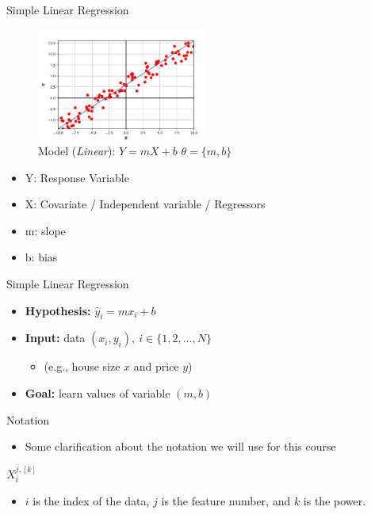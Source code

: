 \begin{frame}{Simple Linear Regression}
    \begin{figure}
        \centering
        \includegraphics[width=0.5\textwidth]{images/linear-regression/linear-regression-5.png}
        \caption*{\small Model (\textit{Linear}): $Y = mX + b$ \hfill $\theta = \{m, b\}$}
    \end{figure}

    \begin{itemize}
        \item Y: Response Variable
        \item X: Covariate / Independent variable / Regressors
        \item m: slope
        \item b: bias
    \end{itemize}
\end{frame}


\begin{frame}{Simple Linear Regression}
    \begin{itemize}
        \item \textbf{Hypothesis:} $\hat{y}_i = mx_i + b$
        
        \item \textbf{Input:} data $(x_i, y_i), \ i \in \{1, 2, \ldots, N\}$
        \begin{itemize}
            \item (e.g., house size $x$ and price $y$)
        \end{itemize}
        
        \item \textbf{Goal:} learn values of variable $(m, b)$
    \end{itemize}
\end{frame}

\begin{frame}{Notation}
    \begin{itemize}
        \item Some clarification about the notation we will use for this course
    \end{itemize}

    \begin{center}
        {\Huge $X_i^{j, [k]}$}
    \end{center}

    \begin{itemize}
        \item $i$ is the index of the data, $j$ is the feature number, and $k$ is the power.
    \end{itemize}
\end{frame}

